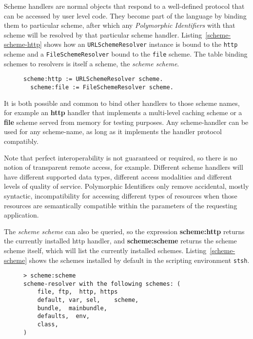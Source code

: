 \documentclass[preprint,authoryear]{llncs}
\begin{document}
Scheme handlers are normal objects that respond to a well-defined protocol that can be
accessed by user level code.  They
become part of the language by binding them to particular scheme, after which
any \emph{Polymorphic Identifiers} with that scheme will be resolved by that particular scheme handler.
Listing~\ref{scheme-scheme-http} shows how an {\tt URLSchemeResolver} instance is bound
to the {\tt http} scheme and a {\tt FileSchemeResolver} bound to the {\tt file} scheme.  The table 
binding schemes to resolvers is itself a scheme, the \emph{scheme scheme}.

\begin{figure}[htbp]
\begin{lstlisting}[style=L,label=scheme-scheme-http,caption=Binding scheme handlers to the http and file schemes.]
  scheme:http := URLSchemeResolver scheme.
  scheme:file := FileSchemeResolver scheme.
\end{lstlisting}
\end{figure}

It is both possible and common to bind other handlers to those scheme
names, for example an {\bf http} handler that implements a multi-level caching scheme
or a {\bf file} scheme served from memory for testing purposes.  Any scheme-handler
can be used for any scheme-name, as long as it implements the handler protocol
compatibly.

Note that perfect interoperability is not guaranteed or required, so there is no notion
of transparent remote access, for example.  Different scheme handlers will have different supported
data types, different access modalities and different levels of quality of service.
Polymorphic Identifiers only remove accidental, mostly syntactic, incompatibility for accessing different types
of resources when those resources are semantically compatible within the parameters
of the requesting application.


The \emph{scheme scheme} can also be queried,
so the expression {\bf scheme:http} returns the currently installed http handler, and 
{\bf scheme:scheme} returns the scheme scheme itself, which will list the currently
installed schemes.  Listing~\ref{scheme-scheme} shows the schemes installed by
default in the scripting environment {\tt stsh}.

\begin{figure}[htbp]
\begin{lstlisting}[style=L,label=scheme-scheme,caption=List of schemes via scheme:scheme.]
> scheme:scheme 
scheme-resolver with the following schemes: (
    file, ftp,  http, https
    default, var, sel,    scheme,
    bundle,  mainbundle,
    defaults,  env,
    class,
)
\end{lstlisting}
\end{figure}
\end{document}
